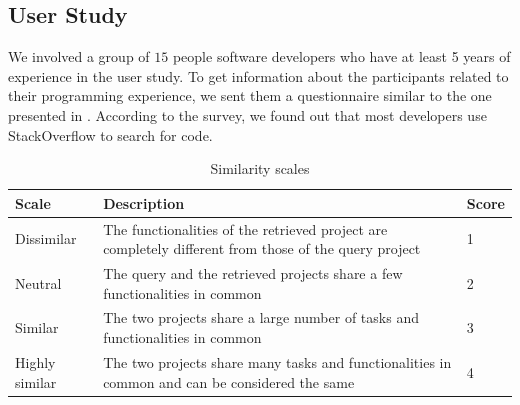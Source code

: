 \newpage
\subsection{User Study}
We involved a group of $15$ people software developers who have at least 5 years of experience in the user study. To get information about the participants related to their programming experience, we sent them a questionnaire similar to the one presented in \cite{McMillan:2012:DSS:2337223.2337267}.%
According to the survey, we found out that most developers use StackOverflow to search for code.

\begin{table}[h!]
	\centering
	\begin{tabular}{|p{2.4cm}|p{8.0cm}|p{1.0cm}|}  \hline
		{\bf Scale} & {\bf Description} & {\bf Score} \\  \hline
		Dissimilar & The functionalities of the retrieved project are completely different from those of the query project & 1 \\ \hline
		Neutral & The query and the retrieved projects share a few functionalities in common & 2 \\ \hline
		Similar & The two projects share a large number of tasks and functionalities in common & 3 \\ \hline
		Highly similar & The two projects share many tasks and functionalities in common and can be considered the same & 4 \\ \hline
	\end{tabular}
	\caption[Similarity scales]{Similarity scales}
	\label{tab:Scales}
\end{table}

